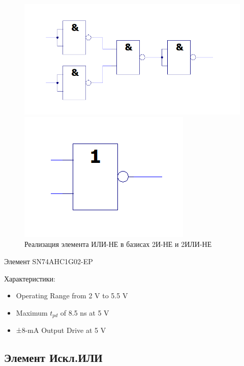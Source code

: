 \begin{figure}[H]
	\centering
	\begin{minipage}{.45\textwidth}
		\centering
		\includegraphics[width=0.85\linewidth]{imgs/1/or-not_and}
	\end{minipage}
	\begin{minipage}{.45\textwidth}
		\centering
		\includegraphics[width=0.85\linewidth]{imgs/1/or-not_or}
	\end{minipage}
	\caption{Реализация элемента ИЛИ-НЕ в базисах 2И-НЕ и 2ИЛИ-НЕ}
\end{figure}

Элемент SN74AHC1G02-EP

Характеристики:
\begin{itemize}
	\item Operating Range from 2 V to 5.5 V
	\item Maximum $t_{pd}$ of 8.5 ns at 5 V
	\item ±8-mA Output Drive at 5 V
\end{itemize}

\subsection{Элемент Искл.ИЛИ}

